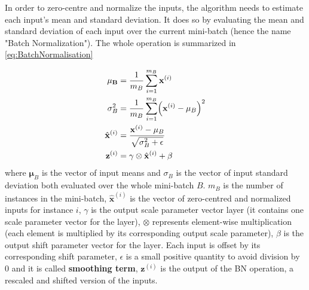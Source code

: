 \documentclass[12pt, letterpaper]{article}
\theoremstyle{definition}
\newcommand{\x}{\mathbf{x}}
\DeclarePairedDelimiter\autobracket{(}{)}
\newcommand{\br}[1]{\autobracket*{#1}}
\let\tb\textbf
\begin{document}
In order to zero-centre and normalize the inputs, the algorithm needs to estimate each input's mean and standard deviation. It does so by evaluating the mean and standard deviation of each input over the current mini-batch (hence the name "Batch Normalization"). The whole operation is summarized in \autoref{eq:BatchNormalisation}

\begin{equation}
\begin{aligned}
\mathbf{\mu_B} &= \frac{1}{m_B} \sum_{i=1}^{m_B} \x^{(i)} \\
\mathbf{\sigma}_B^2 &= \frac{1}{m_B} \sum_{i=1}^{m_B} \br{\x^{(i)} - \mathbf{\mu}_B}^2\\
\hat{\mathbf{x}}^{(i)} &= \frac{\x^{(i)} - \mathbf{\mu}_B}{\sqrt{\mathbf{\sigma}_B^2 +\epsilon}}\\
\mathbf{z}^{(i)} &= \mathbf{\gamma} \otimes \hat{\mathbf{x}}^{(i)} + \mathbf{\beta}
\end{aligned}
\label{eq:BatchNormalisation}
\end{equation}
where $\mathbf{\mu}_B$ is the vector of input means and $\sigma_B$ is the vector of input standard deviation both evaluated over the whole mini-batch $B$. $m_B$ is the number of instances in the mini-batch, $\hat{\mathbf{x}}^{(i)}$ is the vector of zero-centred and normalized inputs for instance $i$, $\gamma$ is the output scale parameter vector layer (it contains one scale parameter vector for the layer), $\otimes$ represents element-wise multiplication (each element is multiplied by its corresponding output scale parameter), $\beta$ is the output shift parameter vector for the layer. Each input is offset by its corresponding shift parameter, $\epsilon$ is a small positive quantity to avoid division by $0$ and it is called \tb{smoothing term}, $\mathbf{z}^{(i)}$ is the output of the BN operation, a rescaled and shifted version of the inputs.
\end{document}

